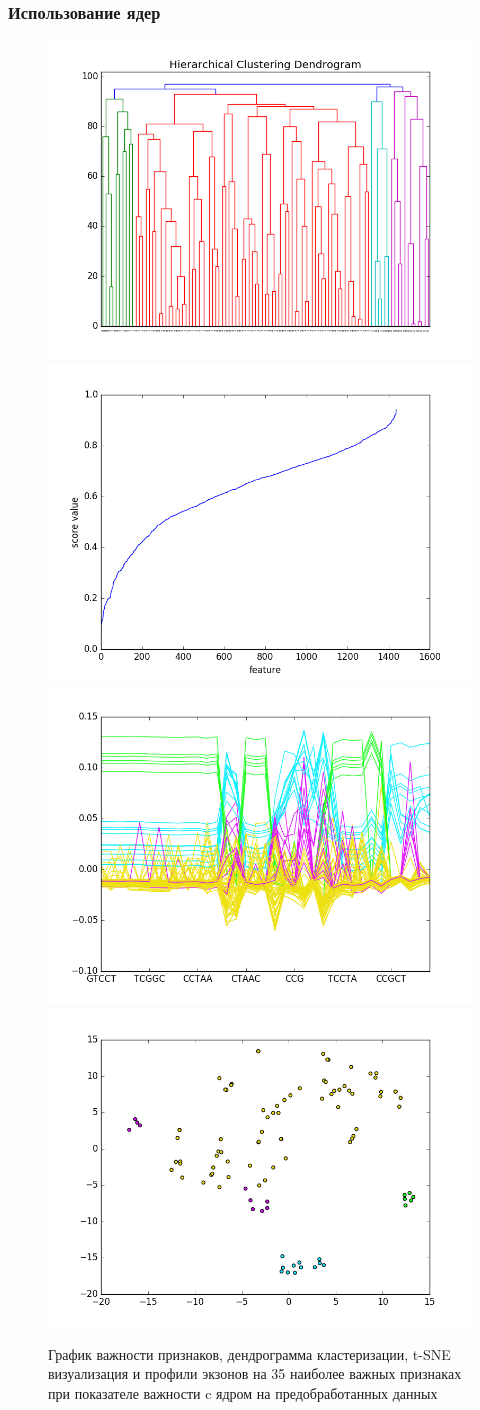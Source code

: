 \subsubsection{Использование ядер}

\begin{figure}[H]
	\includegraphics[width=0.5\linewidth]{pics/dendrograms/spec_norm_cosine.png}
	\includegraphics[width=0.5\linewidth]{pics/graphs/spec_norm_cosine.png}
	\includegraphics[width=0.5\linewidth]{pics/profiles/spec_norm_cosine.png}
	\includegraphics[width=0.5\linewidth]{pics/tsne/spec_norm_cosine.png}
	\caption{График важности признаков, дендрограмма кластеризации, t-SNE визуализация и профили экзонов на 35 наиболее важных признаках при показателе важности c ядром на предобработанных данных}
	\label{spec_norm_cosine}
\end{figure}


